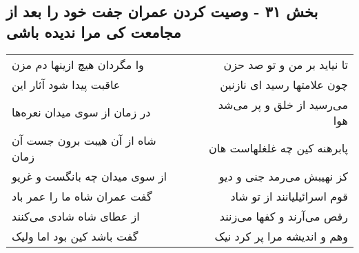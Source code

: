 \begin{center}
\section*{بخش ۳۱ - وصیت کردن عمران جفت خود را بعد  از مجامعت کی مرا ندیده باشی}
\label{sec:sh031}
\begin{longtable}{l p{0.5cm} r}
وا مگردان هیچ ازینها دم مزن
&&
تا نیاید بر من و تو صد حزن
\\
عاقبت پیدا شود آثار این
&&
چون علامتها رسید ای نازنین
\\
در زمان از سوی میدان نعره‌ها
&&
می‌رسید از خلق و پر می‌شد هوا
\\
شاه از آن هیبت برون جست آن زمان
&&
پابرهنه کین چه غلغلهاست هان
\\
از سوی میدان چه بانگست و غریو
&&
کز نهیبش می‌رمد جنی و دیو
\\
گفت عمران شاه ما را عمر باد
&&
قوم اسرائیلیانند از تو شاد
\\
از عطای شاه شادی می‌کنند
&&
رقص می‌آرند و کفها می‌زنند
\\
گفت باشد کین بود اما ولیک
&&
وهم و اندیشه مرا پر کرد نیک
\\
\end{longtable}
\end{center}
